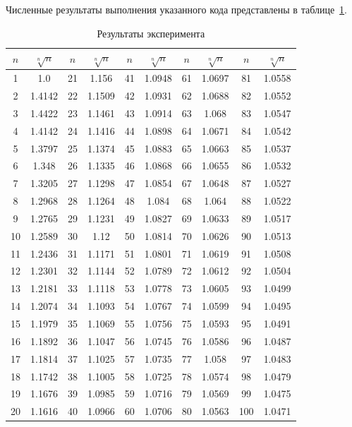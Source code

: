 \documentclass[labwork]{fefudoc}
\begin{document}
Численные результаты выполнения указанного кода представлены в таблице~\ref{таблица с результатами}.
\begin{table}
\centering
\begin{threeparttable}
\caption{Результаты эксперимента}
\label{таблица с результатами}
\begin{tabular}{cc|cc|cc|cc|cc}
\hline
$n$ & $\sqrt[n]{n}$ & $n$ & $\sqrt[n]{n}$ & $n$ & $\sqrt[n]{n}$ & $n$ & $\sqrt[n]{n}$ & $n$ & $\sqrt[n]{n}$ \\
\hline
1 & 1.0 & 21 & 1.156& 41 & 1.0948& 61 & 1.0697& 81 & 1.0558 \\
\hline
2 & 1.4142 & 22 & 1.1509& 42 & 1.0931& 62 & 1.0688& 82 & 1.0552 \\
\hline
3 & 1.4422 & 23 & 1.1461& 43 & 1.0914& 63 & 1.068& 83 & 1.0547 \\
\hline
4 & 1.4142 & 24 & 1.1416& 44 & 1.0898& 64 & 1.0671& 84 & 1.0542 \\
\hline
5 & 1.3797 & 25 & 1.1374& 45 & 1.0883& 65 & 1.0663& 85 & 1.0537 \\
\hline
6 & 1.348 & 26 & 1.1335& 46 & 1.0868& 66 & 1.0655& 86 & 1.0532 \\
\hline
7 & 1.3205 & 27 & 1.1298& 47 & 1.0854& 67 & 1.0648& 87 & 1.0527 \\
\hline
8 & 1.2968 & 28 & 1.1264& 48 & 1.084& 68 & 1.064& 88 & 1.0522 \\
\hline
9 & 1.2765 & 29 & 1.1231& 49 & 1.0827& 69 & 1.0633& 89 & 1.0517 \\
\hline
10 & 1.2589 & 30 & 1.12& 50 & 1.0814& 70 & 1.0626& 90 & 1.0513 \\
\hline
11 & 1.2436 & 31 & 1.1171& 51 & 1.0801& 71 & 1.0619& 91 & 1.0508 \\
\hline
12 & 1.2301 & 32 & 1.1144& 52 & 1.0789& 72 & 1.0612& 92 & 1.0504 \\
\hline
13 & 1.2181 & 33 & 1.1118& 53 & 1.0778& 73 & 1.0605& 93 & 1.0499 \\
\hline
14 & 1.2074 & 34 & 1.1093& 54 & 1.0767& 74 & 1.0599& 94 & 1.0495 \\
\hline
15 & 1.1979 & 35 & 1.1069& 55 & 1.0756& 75 & 1.0593& 95 & 1.0491 \\
\hline
16 & 1.1892 & 36 & 1.1047& 56 & 1.0745& 76 & 1.0586& 96 & 1.0487 \\
\hline
17 & 1.1814 & 37 & 1.1025& 57 & 1.0735& 77 & 1.058& 97 & 1.0483 \\
\hline
18 & 1.1742 & 38 & 1.1005& 58 & 1.0725& 78 & 1.0574& 98 & 1.0479 \\
\hline
19 & 1.1676 & 39 & 1.0985& 59 & 1.0716& 79 & 1.0569& 99 & 1.0475 \\
\hline
20 & 1.1616 & 40 & 1.0966& 60 & 1.0706& 80 & 1.0563& 100 & 1.0471 \\
\hline
\end{tabular}
\end{threeparttable}
\end{table}
\end{document}
